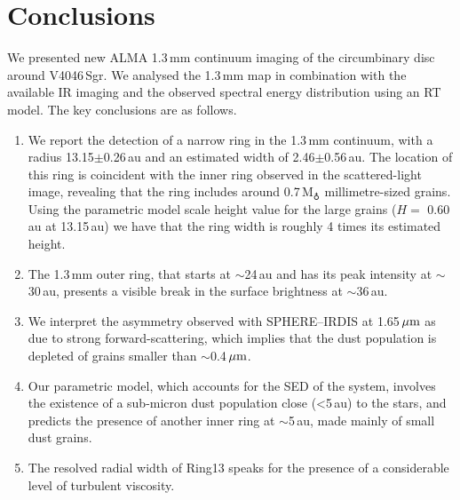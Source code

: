 \documentclass[fleqn,usenatbib,useAMS]{mnras}
\begin{document}
\section{Conclusions} \label{sec:Conclusions}

We presented new ALMA 1.3\,mm continuum imaging of the circumbinary disc around V4046\,Sgr. We analysed the 1.3\,mm map in combination with the available IR imaging and the observed spectral energy distribution using an RT model. The key conclusions are as follows.
\begin{enumerate}
  \item We report the detection of a narrow ring in the 1.3\,mm continuum, with a radius 13.15$\pm$0.26\,au and an estimated width of 2.46$\pm$0.56\,au. The location of this ring is coincident with the inner ring observed in the scattered-light image, revealing that the ring includes around 0.7\,M$_{\earth}$ millimetre-sized grains. Using the parametric model scale height value for the large grains ($H=$ 0.60\,au at 13.15\,au) we have that the ring width is roughly 4 times its estimated height.
  
  \item The 1.3\,mm outer ring, that starts at $\sim$24\,au and has its peak intensity at $\sim$30\,au, presents a visible break in the surface brightness at $\sim$36\,au. 
  
  \item We interpret the asymmetry observed with SPHERE--IRDIS at 1.65\,$\hbox{$\mu$m}$ as due to strong forward-scattering, which implies that the dust population is depleted of grains smaller than $\sim$0.4\,$\hbox{$\mu$m}$.
  
  \item Our parametric model, which accounts for the SED of the system, involves the existence of a sub-micron dust population close (<5\,au) to the stars, and predicts the presence of another inner ring at $\sim$5\,au, made mainly of small dust grains.
  
  \item The resolved radial width of Ring13 speaks for the presence of a considerable level of turbulent viscosity.

    
\end{enumerate}
\end{document}
